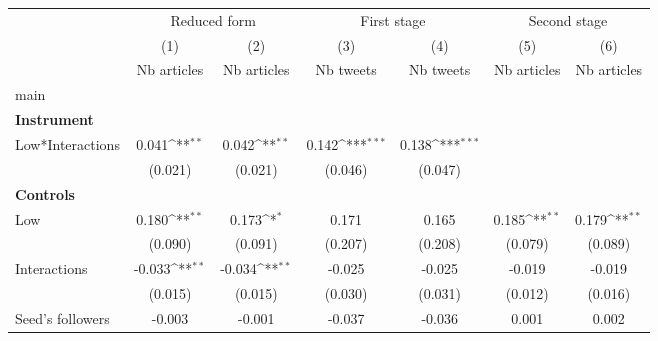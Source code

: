 {
\def\sym#1{\ifmmode^{#1}\else\(^{#1}\)\fi}
\begin{tabular}{l*{6}{c}}
\hline\hline
                    &\multicolumn{2}{c}{Reduced form}           &\multicolumn{2}{c}{First stage}            &\multicolumn{2}{c}{Second stage}           \\\cmidrule(lr){2-3}\cmidrule(lr){4-5}\cmidrule(lr){6-7}
                    &\multicolumn{1}{c}{(1)}&\multicolumn{1}{c}{(2)}&\multicolumn{1}{c}{(3)}&\multicolumn{1}{c}{(4)}&\multicolumn{1}{c}{(5)}&\multicolumn{1}{c}{(6)}\\
                    &\multicolumn{1}{c}{Nb articles}&\multicolumn{1}{c}{Nb articles}&\multicolumn{1}{c}{Nb tweets}&\multicolumn{1}{c}{Nb tweets}&\multicolumn{1}{c}{Nb articles}&\multicolumn{1}{c}{Nb articles}\\
\hline
main                &                     &                     &                     &                     &                     &                     \\
\textbf{Instrument} &                     &                     &                     &                     &                     &                     \\
Low*Interactions    &       0.041\sym{**} &       0.042\sym{**} &       0.142\sym{***}&       0.138\sym{***}&                     &                     \\
                    &     (0.021)         &     (0.021)         &     (0.046)         &     (0.047)         &                     &                     \\
\textbf{Controls}   &                     &                     &                     &                     &                     &                     \\
Low                 &       0.180\sym{**} &       0.173\sym{*}  &       0.171         &       0.165         &       0.185\sym{**} &       0.179\sym{**} \\
                    &     (0.090)         &     (0.091)         &     (0.207)         &     (0.208)         &     (0.079)         &     (0.089)         \\
Interactions        &      -0.033\sym{**} &      -0.034\sym{**} &      -0.025         &      -0.025         &      -0.019         &      -0.019         \\
                    &     (0.015)         &     (0.015)         &     (0.030)         &     (0.031)         &     (0.012)         &     (0.016)         \\
Seed’s followers    &      -0.003         &      -0.001         &      -0.037         &      -0.036         &       0.001         &       0.002         \\

\end{tabular}}
